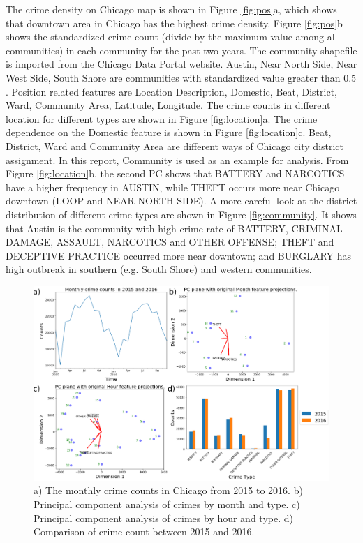 \documentclass[12pt]{article}
\begin{document}
The crime density on Chicago map is shown in Figure \ref{fig:pos}a, which shows that downtown area in Chicago has the highest crime density. Figure \ref{fig:pos}b shows the standardized crime count (divide by the maximum value among all communities) in each community for the past two years. The community shapefile is imported from the Chicago Data Portal website. Austin, Near North Side, Near West Side, South Shore are communities with standardized value greater than $0.5$. Position related features are Location Description, Domestic, Beat, District, Ward, Community Area, Latitude, Longitude. The crime counts in different location for different types are shown in Figure \ref{fig:location}a. The crime dependence on the Domestic feature is shown in Figure \ref{fig:location}c.  
Beat, District, Ward and Community Area are different ways of Chicago city district assignment. In this report, Community is used as an example for analysis. From Figure \ref{fig:location}b, the second PC shows that BATTERY and NARCOTICS have a higher frequency in AUSTIN, while THEFT occurs more near Chicago downtown (LOOP and NEAR NORTH SIDE). A more careful look at the district distribution of different crime types are shown in Figure \ref{fig:community}. It shows that Austin is the community with high crime rate of BATTERY, CRIMINAL DAMAGE, ASSAULT, NARCOTICS and OTHER OFFENSE; THEFT and DECEPTIVE PRACTICE occurred more near downtown; and BURGLARY has high outbreak in southern (e.g. South Shore) and western communities.

\begin{figure}[ht]
\includegraphics[scale=0.3]{figure/time.eps}
\centering
\caption{a) The monthly crime counts in Chicago from 2015 to 2016. b) Principal component analysis of crimes by month and type. c) Principal component analysis of crimes by hour and type. d) Comparison of crime count between 2015 and 2016.}
\label{fig:time}
\end{figure}
\end{document}
